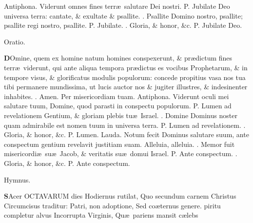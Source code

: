 \documentclass[letter,11pt]{book}
\makeatletter
\DeclareRobustCommand{\Vbar}{\vers@resp{-0.1em}{V}}
\DeclareRobustCommand{\Rbar}{\vers@resp{0pt}{R}}
\newcommand{\vers@resp@sym}{\raisebox{0.2ex}{\rotatebox[origin=c]{-20}{$\m@th\rceil$}}}
\newcommand{\vers@resp}[2]{%
  {\ooalign{\hidewidth\kern#1\vers@resp@sym\hidewidth\cr#2\cr}}%
}%
\def\P{\color{Red} P. \color{black}}
\def\V{\color{Red} \Vbar . \color{black}}
\def\R{\color{Red} \Rbar . \color{black}}
\makeatother
\begin{document}
\begin{multicols*}{2}
\newline \color{Red} Antiphona. \color{black} Viderunt omnes fines terr\ae \ salutare Dei nostri. \P Jubilate Deo universa terra: cantate, \& exultate \& psallite. \V Psallite Domino nostro, psallite; psallite regi nostro, psallite. \P Jubilate. \V Gloria, \& honor, \&c. \P Jubilate Deo.
\vspace{-.5em} \begin{center} \color{Red} Oratio. \color{black} \end{center} \vspace{-.5em}
\lettrine[lines=2]{\bfseries \color{Red} D}{}Omine, quem ex homine natum homines conspexerunt, \& pr\ae dictum fines terr\ae \ viderunt, qui ante aliqua tempora pr\ae dictus es vocibus Prophetarum, \& in tempore visus, \& glorificatus modulis populorum: concede propitius vasa nos tua tibi permanere mundissima, ut lucis auctor nos \& jugiter illustres, \& indesinenter inhabites. \R Amen. Per misericordiam tuam.
\newline \color{Red} Antiphona. \color{black} Viderunt oculi mei salutare tuum, Domine, quod parasti in conspectu populorum. \P Lumen ad revelationem Gentium, \& gloriam plebis tu\ae \ Israel. \V Domine Dominus noster quam admirabile est nomen tuum in universa terra. \P Lumen ad revelationem. \V Gloria, \& honor, \&c. \P Lumen.
\newline \color{Red} Lauda. \color{black} Notum fecit Dominus salutare suum, ante conspectum gentium revelavit justitiam suam.
Alleluia, alleluia. \V Memor fuit misericordi\ae \ su\ae \ Jacob, \& veritatis su\ae \ domui Israel. \P Ante conspectum. \V Gloria, \& honor, \&c. \P Ante conspectum.
\vspace{-1.5em} \begin{center} \color{Red} Hymnus. \color{black} \end{center} \vspace{-.5em}
\lettrine[lines=2]{\bfseries \color{Red} S}{}Acer OCTAVARUM dies
\newline Hodiernus rutilat,
\newline \indent Quo secundum carnem Christus
\newline \indent Circumcisus traditur:
\newline \indent Patri, non adoptione,
\newline \indent Sed co\ae ternus genere.
piritu completur alvus
\newline \indent Incorrupta Virginis,
\newline \indent Qu\ae \ pariens mansit c\ae lebs

\end{multicols*}
\end{document}

